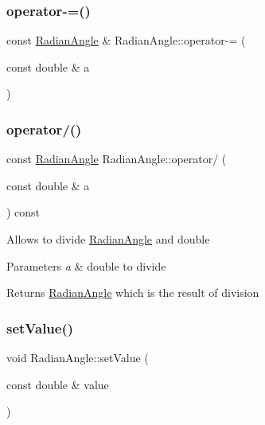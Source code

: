 \hypertarget{class_radian_angle_a2bfd60cced12284db32b4a594b5da2aa}{}\label{class_radian_angle_a2bfd60cced12284db32b4a594b5da2aa} 
\subsubsection{\texorpdfstring{operator-\/=()}{operator-=()}\hspace{0.1cm}{\footnotesize\ttfamily [2/2]}}
{\footnotesize\ttfamily const \hyperlink{class_radian_angle}{Radian\+Angle} \& Radian\+Angle\+::operator-\/= (\begin{DoxyParamCaption}\item[{const double \&}]{a }\end{DoxyParamCaption})}

\hypertarget{class_radian_angle_a60cf94ad19c21efe288f9a73e0dd158e}{}\label{class_radian_angle_a60cf94ad19c21efe288f9a73e0dd158e} 
\subsubsection{\texorpdfstring{operator/()}{operator/()}}
{\footnotesize\ttfamily const \hyperlink{class_radian_angle}{Radian\+Angle} Radian\+Angle\+::operator/ (\begin{DoxyParamCaption}\item[{const double \&}]{a }\end{DoxyParamCaption}) const}

Allows to divide \hyperlink{class_radian_angle}{Radian\+Angle} and double 
\begin{DoxyParams}{Parameters}
{\em a} & double to divide \\
\hline
\end{DoxyParams}
\begin{DoxyReturn}{Returns}
\hyperlink{class_radian_angle}{Radian\+Angle} which is the result of division 
\end{DoxyReturn}
\hypertarget{class_radian_angle_a87dae7c0daf8b7d463f478cdf72e9e9c}{}\label{class_radian_angle_a87dae7c0daf8b7d463f478cdf72e9e9c} 
\subsubsection{\texorpdfstring{set\+Value()}{setValue()}}
{\footnotesize\ttfamily void Radian\+Angle\+::set\+Value (\begin{DoxyParamCaption}\item[{const double \&}]{value }\end{DoxyParamCaption})}


